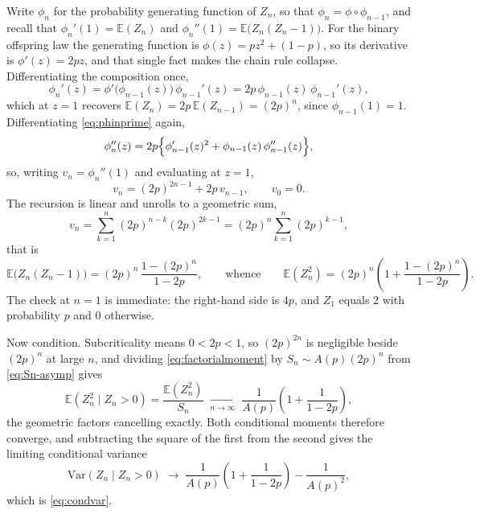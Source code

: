Write $\phi_n$ for the probability generating function of $Z_n$, so that $\phi_n=\phi\circ\phi_{n-1}$, and recall that $\phi_n'(1)=\mathbb{E}(Z_n)$ and $\phi_n''(1)=\mathbb{E}\bigl(Z_n(Z_n-1)\bigr)$. For the binary offspring law the generating function is $\phi(z)=pz^2+(1-p)$, so its derivative is $\phi'(z)=2pz$, and that single fact makes the chain rule collapse. Differentiating the composition once,
\begin{equation}
\label{eq:phinprime}
\phi_n'(z) = \phi'\bigl(\phi_{n-1}(z)\bigr)\,\phi_{n-1}'(z)
= 2p\,\phi_{n-1}(z)\,\phi_{n-1}'(z),
\end{equation}
which at $z=1$ recovers $\mathbb{E}(Z_n)=2p\,\mathbb{E}(Z_{n-1})=(2p)^n$, since $\phi_{n-1}(1)=1$. Differentiating \eqref{eq:phinprime} again,
\begin{equation}
\label{eq:phinsecond}
\phi_n''(z)
= 2p\Bigl\{\phi_{n-1}'(z)^2 + \phi_{n-1}(z)\,\phi_{n-1}''(z)\Bigr\},
\end{equation}
so, writing $v_n=\phi_n''(1)$ and evaluating at $z=1$,
\begin{equation}
\label{eq:vnrecursion}
v_n = (2p)^{2n-1} + 2p\,v_{n-1},
\qquad v_0 = 0 .
\end{equation}
The recursion is linear and unrolls to a geometric sum,
\[
v_n=\sum_{k=1}^{n}(2p)^{n-k}(2p)^{2k-1}
=(2p)^n\sum_{k=1}^{n}(2p)^{k-1},
\]
that is
\begin{equation}
\label{eq:factorialmoment}
\mathbb{E}\bigl(Z_n(Z_n-1)\bigr) = (2p)^n\,\frac{1-(2p)^n}{1-2p},
\qquad\text{whence}\qquad
\mathbb{E}(Z_n^2) = (2p)^n\left(1+\frac{1-(2p)^n}{1-2p}\right).
\end{equation}
The check at $n=1$ is immediate: the right-hand side is $4p$, and $Z_1$ equals $2$ with probability $p$ and $0$ otherwise.

Now condition. Subcriticality means $0<2p<1$, so $(2p)^{2n}$ is negligible beside $(2p)^n$ at large $n$, and dividing \eqref{eq:factorialmoment} by $S_n\sim A(p)(2p)^n$ from \eqref{eq:Sn-asymp} gives
\begin{equation}
\label{eq:condsecondmoment}
\mathbb{E}(Z_n^2\mid Z_n>0)
= \frac{\mathbb{E}(Z_n^2)}{S_n}
\;\xrightarrow[n\to\infty]{}\;
\frac{1}{A(p)}\left(1+\frac{1}{1-2p}\right),
\end{equation}
the geometric factors cancelling exactly. Both conditional moments therefore converge, and subtracting the square of the first from the second gives the limiting conditional variance
\begin{equation}
\label{eq:condvar-app}
\mathrm{Var}(Z_n\mid Z_n>0)
\;\longrightarrow\;
\frac{1}{A(p)}\left(1+\frac{1}{1-2p}\right) - \frac{1}{A(p)^2},
\end{equation}
which is \eqref{eq:condvar}.

